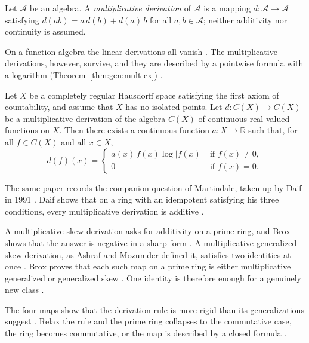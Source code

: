 \begin{definition}\label{def:gen:multiplicative-derivation}
Let $\mathcal{A}$ be an algebra. A \emph{multiplicative derivation} of
$\mathcal{A}$ is a mapping $d\colon\mathcal{A}\to\mathcal{A}$ satisfying
$d(ab)=a\,d(b)+d(a)\,b$ for all $a,b\in\mathcal{A}$; neither additivity nor
continuity is assumed.
\end{definition}

On a function algebra the linear derivations all vanish
\cite[p.~190]{GoldmannSemrl1996}. The multiplicative derivations, however,
survive, and they are described by a pointwise formula with a logarithm (Theorem~\ref{thm:gen:mult-cx})
\cite[p.~191]{GoldmannSemrl1996}.\begin{theorem}\label{thm:gen:mult-cx}
Let $X$ be a completely regular Hausdorff space satisfying the first axiom of
countability, and assume that $X$ has no isolated points. Let
$d\colon C(X)\to C(X)$ be a multiplicative derivation of the algebra $C(X)$
of continuous real-valued functions on $X$. Then there exists a continuous
function $a\colon X\to\mathbb{R}$ such that, for all $f\in C(X)$ and all
$x\in X$,
\begin{equation*}
d(f)(x)=
\begin{cases}
a(x)\,f(x)\log|f(x)| & \text{if }f(x)\neq 0,\\
0 & \text{if }f(x)=0.
\end{cases}
\end{equation*}
\end{theorem}

The same paper records the companion question of Martindale, taken up by Daif
in 1991 \cite[p.~615]{Daif1991}. Daif shows that on a ring with an idempotent
satisfying his three conditions, every multiplicative derivation is additive
\cite[p.~615]{Daif1991}.

A multiplicative skew derivation asks for additivity on a prime ring, and Brox
shows that the answer is negative in a sharp form
\cite[p.~3]{Brox2020TwoSided}. A multiplicative generalized skew derivation, as
Ashraf and Mozumder defined it, satisfies two identities at once
\cite[p.~2]{Brox2020TwoSided}. Brox proves that each such map on a prime ring is
either multiplicative generalized or generalized skew
\cite[Theorem~2.2, pp.~3--4]{Brox2020TwoSided}. One identity is therefore enough
for a genuinely new class \cite[p.~1]{Brox2020TwoSided}.

The four maps show that the derivation rule is more rigid than its
generalizations suggest \cite[p.~867]{Chuang1990Semi}. Relax the rule and the
prime ring collapses to the commutative case, the ring becomes commutative, or
the map is described by a closed formula
\cite[pp.~1106, 191]{Herstein1957}.

